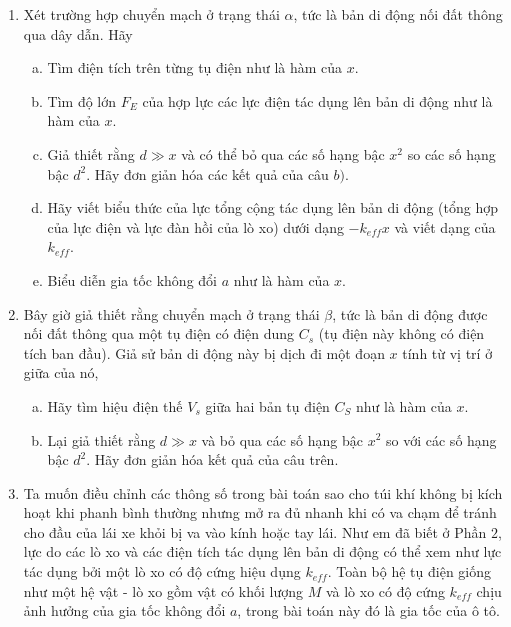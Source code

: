 \begin{vd}
\begin{enumerate}[1)]
    \item Xét trường hợp chuyển mạch ở trạng thái $\alpha$, tức là bản di động nối đất thông qua dây dẫn. Hãy
    \begin{enumerate}[a)]
        \item Tìm điện tích trên từng tụ điện như là hàm của $x$.
        \item Tìm độ lớn $F_{E}$ của hợp lực các lực điện tác dụng lên bản di động như là hàm của $x$.
        \item Giả thiết rằng $d \gg x$ và có thể bỏ qua các số hạng bậc $x^{2}$ so các số hạng bậc $d^{2}$. Hãy đơn giản hóa các kết quả của câu $b)$.
        \item Hãy viết biểu thức của lực tổng cộng tác dụng lên bản di động (tổng hợp của lực điện và lực đàn hồi của lò xo) dưới dạng $-k_{eff}x$ và viết dạng của $k_{eff}$.
        \item Biểu diễn gia tốc không đổi $a$ như là hàm của $x$.
    \end{enumerate}
    \item Bây giờ giả thiết rằng chuyển mạch ở trạng thái $\beta$, tức là bản di động được nối đất thông qua một tụ điện có điện dung $C_{s}$ (tụ điện này không có điện tích ban đầu). Giả sử bản di động này bị dịch đi một đoạn $x$ tính từ vị trí ở giữa của nó,
    \begin{enumerate}[a)]
        \item Hãy tìm hiệu điện thế $V_{s}$ giữa hai bản tụ điện $C_{S}$ như là hàm của $x$.
        \item Lại giả thiết rằng $d \gg x$ và bỏ qua các số hạng bậc $x^{2}$ so với các số hạng bậc $d^{2}$. Hãy đơn giản hóa kết quả của câu trên.
    \end{enumerate}
    \item Ta muốn điều chỉnh các thông số trong bài toán sao cho túi khí không bị kích hoạt khi phanh bình thường nhưng mở ra đủ nhanh khi có va chạm để tránh cho đầu của lái xe khỏi bị va vào kính hoặc tay lái. Như em đã biết ở Phần $2$, lực do các lò xo và các điện tích tác dụng lên bản di động có thể xem như lực tác dụng bởi một lò xo có độ cứng hiệu dụng $k_{eff}$. Toàn bộ hệ tụ điện giống như một hệ vật - lò xo gồm vật có khối lượng $M$ và lò xo có độ cứng $k_{eff}$ chịu ảnh hưởng của gia tốc không đổi $a$, trong bài toán này đó là gia tốc của ô tô.\\
    

\end{enumerate}
\end{vd}
